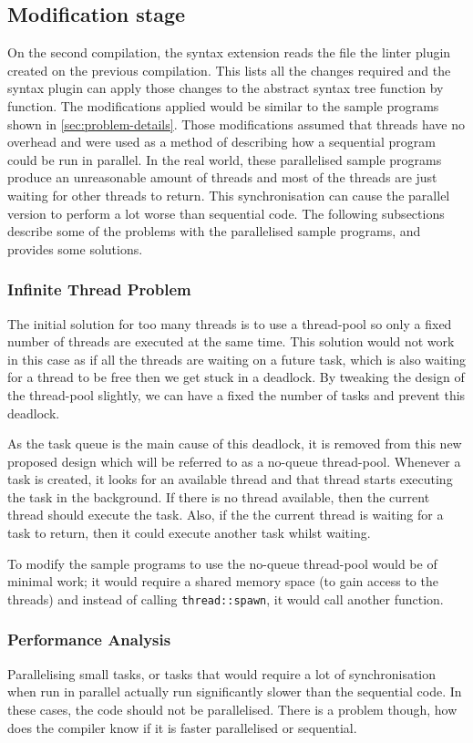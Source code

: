 \documentclass[conference]{IEEEtran}
\begin{document}
\subsection{Modification stage}
On the second compilation, the syntax extension reads the file the linter plugin created on the previous compilation. This lists all the changes required and the syntax plugin can apply those changes to the abstract syntax tree function by function. The modifications applied would be similar to the sample programs shown in \autoref{sec:problem-details}. Those modifications assumed that threads have no overhead and were used as a method of describing how a sequential program could be run in parallel. In the real world, these parallelised sample programs produce an unreasonable amount of threads and most of the threads are just waiting for other threads to return. This synchronisation can cause the parallel version to perform a lot worse than sequential code. The following subsections describe some of the problems with the parallelised sample programs, and provides some solutions.

\subsubsection{Infinite Thread Problem}
The initial solution for too many threads is to use a thread-pool so only a fixed number of threads are executed at the same time. This solution would not work in this case as if all the threads are waiting on a future task, which is also waiting for a thread to be free then we get stuck in a deadlock. By tweaking the design of the thread-pool slightly, we can have a fixed the number of tasks and prevent this deadlock.

As the task queue is the main cause of this deadlock, it is removed from this new proposed design which will be referred to as a no-queue thread-pool. Whenever a task is created, it looks for an available thread and that thread starts executing the task in the background. If there is no thread available, then the current thread should execute the task. Also, if the the current thread is waiting for a task to return, then it could execute another task whilst waiting.

To modify the sample programs to use the no-queue thread-pool would be of minimal work; it would require a shared memory space (to gain access to the threads) and instead of calling \texttt{thread::spawn}, it would call another function.

\subsubsection{Performance Analysis}
Parallelising small tasks, or tasks that would require a lot of synchronisation when run in parallel actually run significantly slower than the sequential code. In these cases, the code should not be parallelised. There is a problem though, how does the compiler know if it is faster parallelised or sequential.
\end{document}
